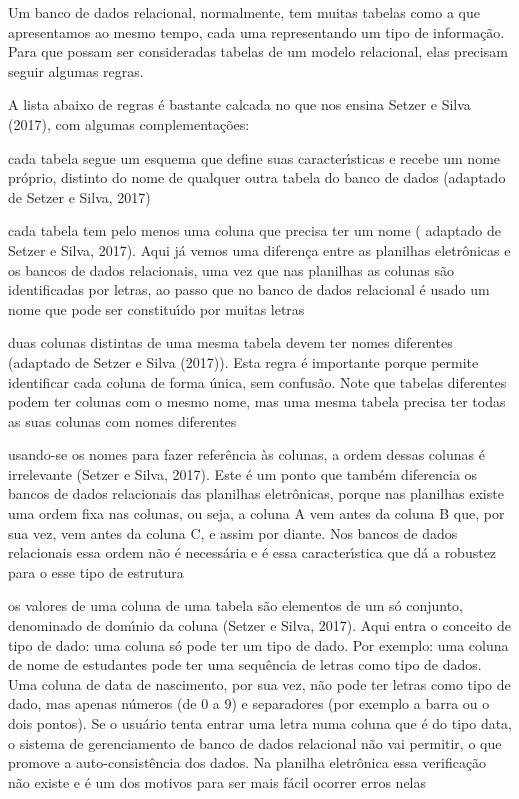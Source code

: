 \documentclass[
12pt,		%
openright,	%
twoside,  %
a4paper,			%
chapter=TITLE,		%
english,			%
french,				%
spanish,			%
brazil				%
]{USPSC-classe/USPSC}
\begin{document}
Um banco de dados relacional, normalmente, tem muitas tabelas como a que apresentamos ao mesmo tempo, cada uma representando um tipo de informa\c{c}\~ao. Para que possam ser consideradas tabelas de um modelo relacional, elas precisam seguir algumas regras.










A lista abaixo de regras \'e bastante calcada no que nos ensina  Setzer e Silva (2017), com algumas complementa\c{c}\~oes:











\begin{alineas}
\item cada tabela segue um esquema que define suas caracter\'{\i}sticas e recebe um nome pr\'oprio, distinto do nome de qualquer outra tabela do banco de dados (adaptado de Setzer e Silva, 2017)
\item cada tabela tem pelo menos uma coluna que precisa ter um nome ( adaptado de Setzer e Silva, 2017). Aqui j\'a vemos uma diferen\c{c}a entre as planilhas eletr\^onicas e os bancos de dados relacionais, uma vez que nas planilhas as colunas s\~ao identificadas por letras, ao passo que no banco de dados relacional \'e usado um nome que pode ser constitu\'{\i}do por muitas letras
\item duas colunas distintas de uma mesma tabela devem ter nomes diferentes (adaptado de Setzer e Silva (2017)). Esta regra \'e importante porque permite identificar cada coluna de forma \'unica, sem confus\~ao. Note que tabelas diferentes podem ter colunas com o mesmo nome, mas uma mesma tabela precisa ter todas as suas colunas com nomes diferentes
\item usando-se os nomes para fazer refer\^encia \`as colunas, a ordem dessas colunas \'e irrelevante  (Setzer e Silva, 2017). Este \'e um ponto que tamb\'em diferencia os bancos de dados relacionais das planilhas eletr\^onicas, porque nas planilhas existe uma ordem fixa nas colunas, ou seja, a coluna A vem antes da coluna B que, por sua vez, vem antes da coluna C, e assim por diante. Nos bancos de dados relacionais essa ordem n\~ao \'e necess\'aria e \'e essa caracter\'{\i}stica que d\'a a robustez para o esse tipo de estrutura
\item os valores de uma coluna de uma tabela s\~ao elementos de um s\'o conjunto, denominado de dom\'{\i}nio da coluna  (Setzer e Silva, 2017). Aqui entra o conceito de tipo de dado: uma coluna s\'o pode ter um tipo de dado. Por exemplo: uma coluna de nome de estudantes pode ter uma sequ\^encia de letras como tipo de dados. Uma coluna de data de nascimento, por sua vez, n\~ao pode ter letras como tipo de dado, mas apenas n\'umeros (de 0 a 9) e separadores (por exemplo a barra ou o dois pontos). Se o usu\'ario tenta entrar uma letra numa coluna que \'e do tipo data, o sistema de gerenciamento de banco de dados relacional n\~ao vai permitir, o que promove a auto-consist\^encia dos dados. Na planilha eletr\^onica essa verifica\c{c}\~ao n\~ao existe e \'e um dos motivos para ser mais f\'acil ocorrer erros nelas

\end{alineas}
\end{document}
